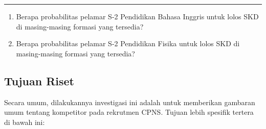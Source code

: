 \documentclass[
]{article}
\providecommand{\tightlist}{%
  \setlength{\itemsep}{0pt}\setlength{\parskip}{0pt}}
\begin{document}
\begin{center}\rule{0.5\linewidth}{0.5pt}\end{center}

\begin{enumerate}
\def\labelenumi{\arabic{enumi}.}
\setcounter{enumi}{14}
\tightlist
\item
  Berapa probabilitas pelamar S-2 Pendidikan Bahasa Inggris untuk lolos
  SKD di masing-masing formasi yang tersedia?
\item
  Berapa probabilitas pelamar S-2 Pendidikan Fisika untuk lolos SKD di
  masing-masing formasi yang tersedia?
\end{enumerate}

\subsection{Tujuan Riset}\label{tujuan-riset}

Secara umum, dilakukannya investigasi ini adalah untuk memberikan
gambaran umum tentang kompetitor pada rekrutmen CPNS. Tujuan lebih
spesifik tertera di bawah ini:
\end{document}
